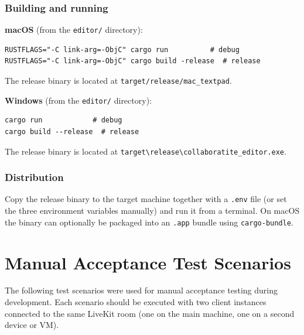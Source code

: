 \documentclass[a4paper,11pt,twoside]{report}
\theoremstyle{definition}
\begin{document}
\subsection*{Building and running}

\textbf{macOS} (from the \texttt{editor/} directory):
\begin{verbatim}
RUSTFLAGS="-C link-arg=-ObjC" cargo run          # debug
RUSTFLAGS="-C link-arg=-ObjC" cargo build -release  # release
\end{verbatim}
The release binary is located at \texttt{target/release/mac\_textpad}.

\textbf{Windows} (from the \texttt{editor/} directory):
\begin{verbatim}
cargo run            # debug
cargo build --release  # release
\end{verbatim}
The release binary is located at \texttt{target\textbackslash release\textbackslash collaboratite\_editor.exe}.

\subsection*{Distribution}

Copy the release binary to the target machine together with a \texttt{.env} file (or
set the three environment variables manually) and run it from a terminal. On macOS the
binary can optionally be packaged into an \texttt{.app} bundle using
\texttt{cargo-bundle}.


\chapter{Manual Acceptance Test Scenarios}
\thispagestyle{empty}

The following test scenarios were used for manual acceptance testing during development.
Each scenario should be executed with two client instances connected to the same LiveKit
room (one on the main machine, one on a second device or VM).
\end{document}
